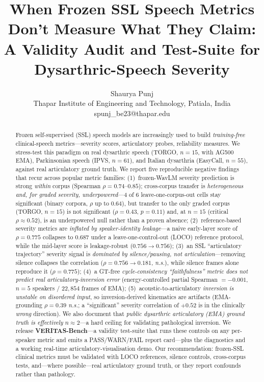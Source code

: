 \documentclass[10pt,twocolumn]{article}
\title{\bfseries When Frozen SSL Speech Metrics Don't Measure What They
Claim:\\ A Validity Audit and Test-Suite for Dysarthric-Speech Severity}
\author{Shaurya Punj\\ \small Thapar Institute of Engineering and Technology, Patiala, India\\
\small spunj\_be23@thapar.edu}
\date{}
\newcommand{\ns}{\emph{n.s.}}
\begin{document}
\maketitle

\begin{abstract}
\noindent
Frozen self-supervised (SSL) speech models are increasingly used to build
\emph{training-free} clinical-speech metrics---severity scores, articulatory
probes, reliability measures. We stress-test this paradigm on real dysarthric
speech (TORGO, $n{=}15$, with AG500 EMA), Parkinsonian speech (IPVS, $n{=}61$),
and Italian dysarthria (EasyCall, $n{=}55$), against real articulatory ground
truth. We report five reproducible negative findings that recur across popular
metric families: (1)~frozen-WavLM severity prediction is strong \emph{within}
corpus (Spearman $\rho{=}0.74$--$0.85$); cross-corpus transfer is
\emph{heterogeneous and, for graded severity, underpowered}---4 of 6
leave-one-corpus-out cells stay significant (binary corpora, $\rho$ up to
$0.64$), but transfer to the only graded corpus (TORGO, $n{=}15$) is not
significant ($\rho{=}0.43$, $p{=}0.11$) and, at $n{=}15$ (critical
$\rho{\approx}0.52$), is an underpowered null rather than a proven absence; (2)~reference-based severity metrics are \emph{inflated by
speaker-identity leakage}---a naive early-layer score of $\rho{=}0.775$
collapses to $0.687$ under a leave-one-control-out (LOCO) reference protocol,
while the mid-layer score is leakage-robust ($0.756{\to}0.756$); (3)~an SSL
``articulatory trajectory'' severity signal is \emph{dominated by
silence/pausing, not articulation}---removing silence collapses the correlation
($\rho{=}0.756{\to}0.181$, \ns), while silence frames alone reproduce it
($\rho{=}0.775$); (4)~a GT-free \emph{cycle-consistency ``faithfulness'' metric
does not predict real articulatory-inversion error} (energy-controlled partial
Spearman $=-0.001$, $n{=}5$ speakers / $22{,}854$ frames of EMA); (5)~acoustic-to-articulatory
\emph{inversion is unstable on disordered input}, so inversion-derived
kinematics are artifacts (EMA-grounding $\rho{=}0.39$ \ns; a ``significant''
severity correlation of $+0.52$ is in the clinically \emph{wrong} direction). We
also document that \emph{public dysarthric articulatory (EMA) ground truth is
effectively} $n{\approx}2$---a hard ceiling for validating pathological
inversion. We release \textbf{VERITAS-Bench}---a validity test-suite that runs these
controls on any per-speaker metric and emits a PASS/WARN/FAIL report card---plus
the diagnostics and a working real-time articulatory-visualisation demo. Our
recommendation: frozen-SSL clinical metrics must be validated with LOCO
references, silence controls, cross-corpus tests, and---where possible---real
articulatory ground truth, or they report confounds rather than pathology.
\end{abstract}
\end{document}
